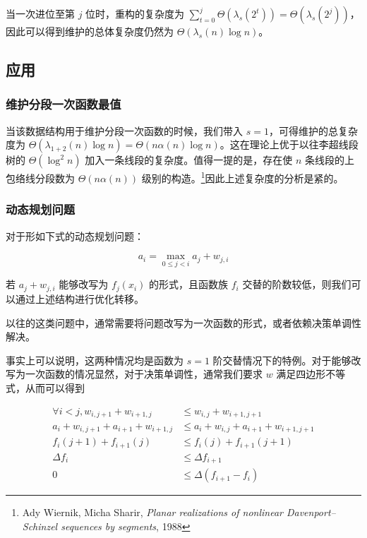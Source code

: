 \documentclass{noithesis}
\begin{document}
当一次进位至第 $j$ 位时，重构的复杂度为 $ \sum_{t=0}^j \Theta(\lambda_s(2^t)) = \Theta(\lambda_s(2^j))$，因此可以得到维护的总体复杂度仍然为 $\Theta(\lambda_s(n)\log n)$。

\subsection{应用}

\subsubsection{维护分段一次函数最值}

当该数据结构用于维护分段一次函数的时候，我们带入 $s = 1$，可得维护的总复杂度为 $\Theta(\lambda_{1+2}(n)\log n) = \Theta(n\alpha(n)\log n)$。这在理论上优于以往李超线段树的 $\Theta(\log^2 n)$ 加入一条线段的复杂度。值得一提的是，存在使 $n$ 条线段的上包络线分段数为 $\Theta(n\alpha(n))$ 级别的构造。\footnote{Ady Wiernik, Micha Sharir, \emph{Planar realizations of nonlinear Davenport–Schinzel sequences by segments}, 1988}因此上述复杂度的分析是紧的。

\subsubsection{动态规划问题}

对于形如下式的动态规划问题：

$$
a_i = \max_{0\le j < i} a_j + w_{j,i}
$$

若 $a_j + w_{j, i}$ 能够改写为 $f_j(x_i)$ 的形式，且函数族 $f_i$ 交替的阶数较低，则我们可以通过上述结构进行优化转移。

以往的这类问题中，通常需要将问题改写为一次函数的形式，或者依赖决策单调性解决。

事实上可以说明，这两种情况均是函数为 $s = 1$ 阶交替情况下的特例。对于能够改写为一次函数的情况显然，对于决策单调性，通常我们要求 $w$ 满足四边形不等式，从而可以得到

\begin{align*}
\forall i < j, w_{i,j+1} + w_{i+1, j} & \le w_{i,j} + w_{i+1,j+1} \\
a_i + w_{i,j+1} + a_{i+1} + w_{i+1, j} & \le a_i + w_{i,j} + a_{i+1} + w_{i+1,j+1} \\
f_i(j+1) + f_{i+1}(j) & \le f_i(j) + f_{i+1}(j + 1)\\
\Delta f_i & \le \Delta f_{i+1} \\
0 &\le \Delta (f_{i + 1} - f_i)
\end{align*}
\end{document}
